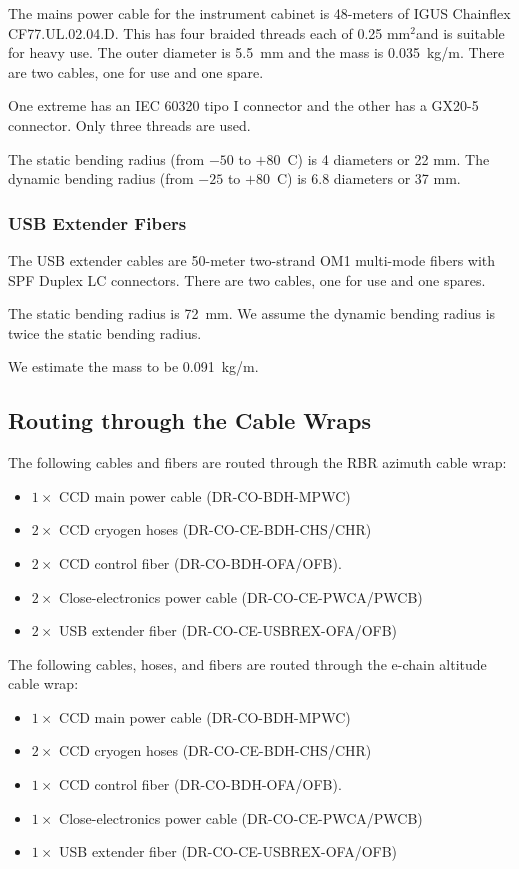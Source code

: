 \documentclass{article}
\newcommand{\sqmm}{\mbox{mm$^2$}}
\begin{document}
The mains power cable for the instrument cabinet is 48-meters of IGUS Chainflex CF77.UL.02.04.D. This has four braided threads each of 0.25 \sqmm and is suitable for heavy use. The outer diameter is 5.5~mm and the mass is 0.035~kg/m. There are two cables, one for use and one spare.

One extreme has an IEC 60320 tipo I connector and the other has a GX20-5 connector. Only three threads are used.

The static bending radius (from $-50$ to $+80$~C) is 4 diameters or 22 mm. The dynamic bending radius (from $-25$ to $+80$~C) is 6.8 diameters or 37 mm.

\subsubsection{USB Extender Fibers}

The USB extender cables are 50-meter two-strand OM1 multi-mode fibers with SPF Duplex LC connectors. There are two cables, one for use and one spares.

The static bending radius is 72~mm. We assume the dynamic bending radius is twice the static bending radius.

We estimate the mass to be 0.091~kg/m.

\subsection{Routing through the Cable Wraps}

The following cables and fibers are routed through the RBR azimuth cable wrap:
\begin{itemize}
\item $1 \times$ CCD main power cable (DR-CO-BDH-MPWC)
\item $2 \times$ CCD cryogen hoses (DR-CO-CE-BDH-CHS/CHR)
\item $2 \times$ CCD control fiber (DR-CO-BDH-OFA/OFB).
\item $2 \times$ Close-electronics power cable (DR-CO-CE-PWCA/PWCB)
\item $2 \times$ USB extender fiber (DR-CO-CE-USBREX-OFA/OFB)
\end{itemize}

The following cables, hoses, and fibers are routed through the e-chain altitude cable wrap:
\begin{itemize}
\item $1 \times$ CCD main power cable (DR-CO-BDH-MPWC)
\item $2 \times$ CCD cryogen hoses (DR-CO-CE-BDH-CHS/CHR)
\item $1 \times$ CCD control fiber (DR-CO-BDH-OFA/OFB).
\item $1 \times$ Close-electronics power cable (DR-CO-CE-PWCA/PWCB)
\item $1 \times$ USB extender fiber (DR-CO-CE-USBREX-OFA/OFB)
\end{itemize}
\end{document}
